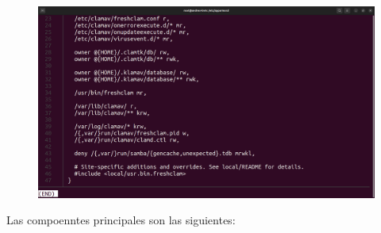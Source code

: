 \documentclass{article}
\begin{document}
\begin{figure}[H]
    \includegraphics[width=\textwidth]{imagenes/Captura desde 2022-10-18 16-14-08.png}
\end{figure}

\newpage

Las compoenntes principales son las siguientes:

\end{document}
